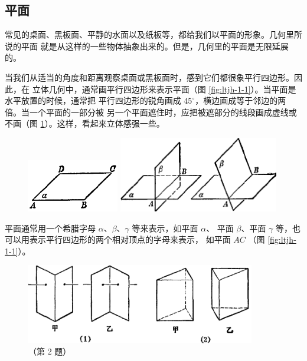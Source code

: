 \subsection{平面}\label{subsec:1-1}

常见的桌面、黑板面、平静的水面以及纸板等，都给我们以平面的形象。几何里所说的平面
就是从这样的一些物体抽象出来的。但是，几何里的平面是无限延展的。

当我们从适当的角度和距离观察桌面或黑板面时，感到它们都很象平行四边形。因此，在
立体几何中，通常画平行四边形来表示平面（图 \ref{fig:ltjh-1-1}）。当平面是水平放置的时候，通常把
平行四边形的锐角画成 $45^\circ$，横边画成等于邻边的两倍。当一个平面的一部分被
另一个平面遮住时，应把被遮部分的线段画成虚线或不画（图 \ref{fig:ltjh-1-2}）。这样，看起来立体感强一些。

\begin{figure}[htbp]
    \centering
    \begin{minipage}[b]{7cm}
        \centering
        \includegraphics[width=4cm]{../pic/ltjh-ch1-01.png}
        \caption{}\label{fig:ltjh-1-1}
    \end{minipage}
    \qquad
    \begin{minipage}[b]{7cm}
        \centering
        \includegraphics[width=7cm]{../pic/ltjh-ch1-02.png}
        \caption{}\label{fig:ltjh-1-2}
    \end{minipage}
\end{figure}

平面通常用一个希腊字母 $\alpha$、$\beta$、$\gamma$ 等来表示，如平面 $\alpha$、
平面 $\beta$、平面 $\gamma$ 等，也可以用表示平行四边形的两个相对顶点的字母来表示，
如平面 $AC$ （图 \ref{fig:ltjh-1-1}）。


\begin{lianxi}



\begin{figure}[htbp]
    \centering
    \includegraphics[width=10cm]{../pic/ltjh-ch1-subsec1-lx-02.png}
    \caption*{（第 2 题）}
\end{figure}

\end{lianxi}


